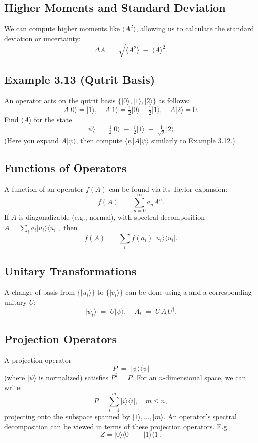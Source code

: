 \documentclass{article}
\begin{document}
\subsection*{Higher Moments and Standard Deviation}
We can compute higher moments like \(\langle A^2\rangle\), allowing us to calculate the standard deviation or uncertainty:
\[
\Delta A \;=\; \sqrt{\langle A^2\rangle \;-\; \langle A\rangle^2}.
\]

\subsection*{Example 3.13 (Qutrit Basis)}
An operator acts on the qutrit basis \(\{\lvert 0\rangle, \lvert 1\rangle, \lvert 2\rangle \}\) as follows:
\[
A\lvert 0\rangle = \lvert 1\rangle, \quad
A\lvert 1\rangle
= \tfrac{1}{2}\lvert 0\rangle + \tfrac{1}{2}\lvert 1\rangle,\quad
A\lvert 2\rangle = 0.
\]
Find \(\langle A \rangle\) for the state
\[
\lvert \psi\rangle \;=\; \tfrac{1}{2}\lvert 0\rangle
\;-\; \tfrac{i}{2} \lvert 1\rangle
\;+\; \tfrac{1}{\sqrt{2}} \lvert 2\rangle.
\]
(Here you expand \(A\lvert\psi\rangle\), then compute \(\langle \psi \lvert A \lvert \psi\rangle\) similarly to Example 3.12.)

\subsection*{Functions of Operators}
A function of an operator \(f(A)\) can be found via its Taylor expansion:
\[
f(A) \;=\; \sum_{n=0}^\infty a_n A^n.
\]
If \(A\) is diagonalizable (e.g., normal), with spectral decomposition
\(
A = \sum_i a_i \lvert u_i\rangle \langle u_i\rvert,
\)
then
\[
f(A) \;=\; \sum_i f(a_i)\,\lvert u_i\rangle \langle u_i\rvert.
\]

\subsection*{Unitary Transformations}
A change of basis from \(\{|u_i\rangle\}\) to \(\{|v_i\rangle\}\) can be done using a and a corresponding unitary \(U\):
\[
\lvert \psi_t\rangle \;=\; U \lvert \psi\rangle,
\quad
A_t \;=\; U\,A\,U^\dagger.
\]

\subsection*{Projection Operators}
A projection operator
\[
P \;=\; \lvert \psi\rangle \langle \psi\rvert
\]
(where \(\lvert \psi\rangle\) is normalized) satisfies \(P^2=P\). For an \(n\)-dimensional space, we can write:
\[
P = \sum_{i=1}^m \lvert i\rangle\langle i\rvert,\quad m \le n,
\]
projecting onto the subspace spanned by \(\lvert 1\rangle, \dots, \lvert m\rangle\).  An operator's spectral decomposition can be viewed in terms of these projection operators.  E.g., 
\[
Z = \lvert 0\rangle\langle 0\rvert \;-\; \lvert 1\rangle\langle 1\rvert.
\]
\end{document}
